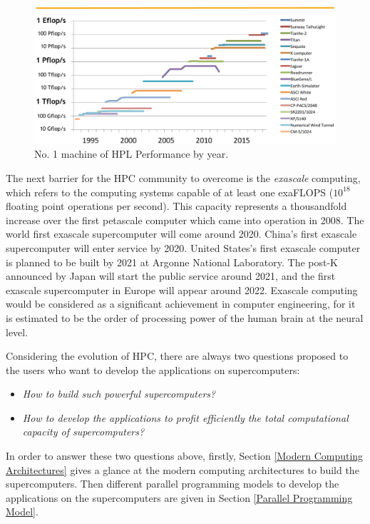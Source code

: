 \begin{figure}[t]
	\centering
	\includegraphics[width=6.3in]{fig/top500_3.pdf}
	\caption{No. 1 machine of HPL Performance by year.}
	\label{hpl_by_year}
\end{figure}

The next barrier for the HPC community to overcome is the \textit{exascale} computing, which refers to the computing systems capable of at least one exaFLOPS ($10^{18}$ floating point operations per second). This capacity represents a thousandfold increase over the first petascale computer which came into operation in 2008. The world first exascale supercomputer will come around 2020. China's first exascale supercomputer will enter service by 2020. United States's first exascale computer is planned to be built by 2021 at Argonne National Laboratory. The post-K announced by Japan will start the public service around 2021, and the first exascale supercomputer in Europe will appear around 2022. Exascale computing would be considered as a significant achievement in computer engineering, for it is estimated to be the order of processing power of the human brain at the neural level.

Considering the evolution of HPC, there are always two questions proposed to the users who want to develop the applications on supercomputers:

\begin{itemize}
	\item \textit{How to build such powerful supercomputers?}
	\item \textit{How to develop the applications to profit efficiently the total computational capacity of supercomputers?}
\end{itemize}

In order to answer these two questions above, firstly, Section \ref{Modern Computing Architectures} gives a glance at the modern computing architectures to build the supercomputers. Then different parallel programming models to develop the applications on the supercomputers are given in Section \ref{Parallel Programming Model}.


